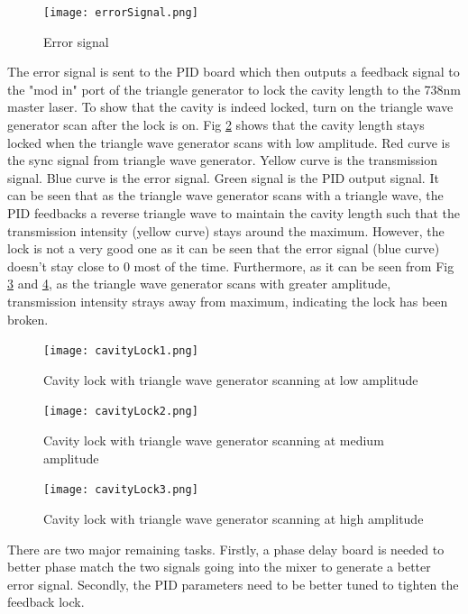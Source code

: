 \documentclass[12pt]{report}
\begin{document}
\begin{figure}[H]
    \centering
    \texttt{[image: errorSignal.png]}
    \caption{Error signal}
    \label{fig:errorSignal}
\end{figure}

The error signal is sent to the PID board which then outputs a feedback signal to the "mod in" port of the triangle generator to lock the cavity length to the 738nm master laser. To show that the cavity is indeed locked, turn on the triangle wave generator scan after the lock is on. Fig \ref{fig:cavityLock1} shows that the cavity length stays locked when the triangle wave generator scans with low amplitude. Red curve is the sync signal from triangle wave generator. Yellow curve is the transmission signal. Blue curve is the error signal. Green signal is the PID output signal. It can be seen that as the triangle wave generator scans with a triangle wave, the PID feedbacks a reverse triangle wave to maintain the cavity length such that the transmission intensity (yellow curve) stays around the maximum. However, the lock is not a very good one as it can be seen that the error signal (blue curve) doesn't stay close to 0 most of the time. Furthermore, as it can be seen from Fig \ref{fig:cavityLock2} and \ref{fig:cavityLock3}, as the triangle wave generator scans with greater amplitude, transmission intensity strays away from maximum, indicating the lock has been broken. 

\begin{figure}[H]
    \centering
    \texttt{[image: cavityLock1.png]}
    \caption{Cavity lock with triangle wave generator scanning at low amplitude}
    \label{fig:cavityLock1}
\end{figure}

\begin{figure}[H]
    \centering
    \texttt{[image: cavityLock2.png]}
    \caption{Cavity lock with triangle wave generator scanning at medium amplitude}
    \label{fig:cavityLock2}
\end{figure}

\begin{figure}[H]
    \centering
    \texttt{[image: cavityLock3.png]}
    \caption{Cavity lock with triangle wave generator scanning at high amplitude}
    \label{fig:cavityLock3}
\end{figure}

There are two major remaining tasks. Firstly, a phase delay board is needed to better phase match the two signals going into the mixer to generate a better error signal. Secondly, the PID parameters need to be better tuned to tighten the feedback lock. 
\end{document}
